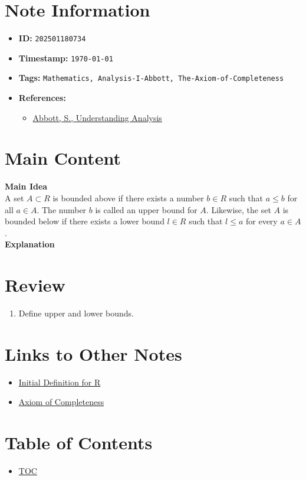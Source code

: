 \clearpage
{}
\label{202501180734}
\renewcommand{\notetitle}{Upper and Lower Bounds}

\section*{Note Information}
\begin{itemize}
  \item \textbf{ID:} \texttt{202501180734}
  \item \textbf{Timestamp:} \texttt{\today \ \currenttime}
  \item \textbf{Tags:} \texttt{Mathematics, Analysis-I-Abbott, The-Axiom-of-Completeness}
  \item \textbf{References:}
    \begin{itemize}
      \item \href{/home/garrett/Personal/References/Mathematics/Analysis-I/Abbott.pdf}{Abbott, S., Understanding Analysis}
    \end{itemize}
\end{itemize}


\section*{Main Content}
\textbf{Main Idea}\\
A set $A \subset R$ is bounded above if there exists a number $b \in R$ such that $a \leq b$ for all $a \in A$. The number $b$ is called an upper bound for $A$. Likewise, the set $A$ is bounded below if there exists a lower bound $l \in R$ such that $l \leq a$ for every $a \in A$. \\

\textbf{Explanation}\\


\section*{Review}
\begin{enumerate}
  \item Define upper and lower bounds.
\end{enumerate}


\section*{Links to Other Notes}
\begin{itemize}
  \item \hyperref[202501180703]{Initial Definition for R}
  \item \hyperref[202501180727]{Axiom of Completeness}
\end{itemize}

\section*{Table of Contents}

\begin{itemize}
  \item \hyperref[toc]{TOC}
\end{itemize}

